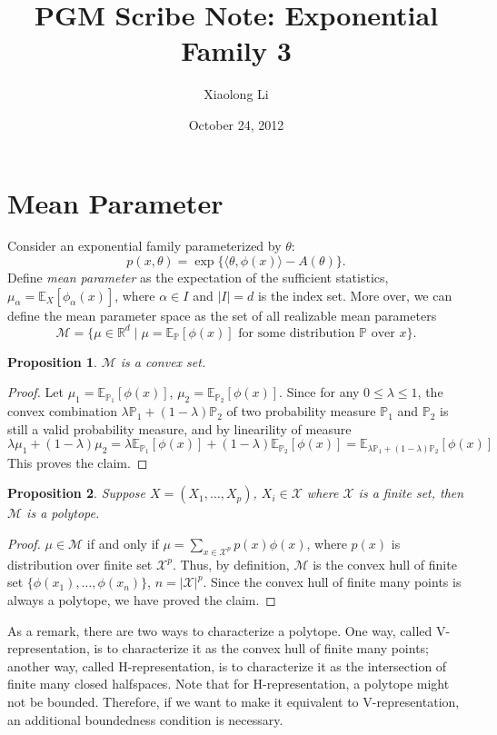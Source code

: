 \documentclass[11pt]{article}
\title{PGM Scribe Note: Exponential Family 3}
\author{Xiaolong Li}
\date{October 24, 2012}
\newcommand{\Xc}{\mathcal{X}}
\newcommand{\Mc}{\mathcal{M}}
\newcommand{\E}{\mathbb{E}}
\newcommand{\R}{\mathbb{R}}
\newcommand{\prob}{\mathbb{P}}
\newcommand{\1}{\mathbbm{1}}
\newtheorem{prop}{Proposition}
\begin{document}
\maketitle

\section{Mean Parameter}
Consider an exponential family parameterized by $\theta$:
\[
p(x, \theta) = \exp\{\langle \theta, \phi(x) \rangle - A(\theta)\}.
\]
Define \emph{mean parameter} as the expectation of the sufficient statistics,
$\mu_\alpha = \E_X[\phi_\alpha(x)]$, where $\alpha \in I$ and $|I| = d$ is the index set. More
over, we can define the mean parameter space as the set of all realizable mean
parameters
\[
\Mc = \{\mu \in \R^d \; | \; \mu = \E_\prob[\phi(x)] \text{ for some distribution } \prob \text{ over } x\}.
\]

\begin{prop}
$\Mc$ is a convex set.
\end{prop}
\begin{proof}
Let $\mu_1 = \E_{\prob_1}[\phi(x)]$, $\mu_2 = \E_{\prob_2}[\phi(x)]$.
Since for any $0 \leq \lambda \leq 1$, the convex combination $\lambda \prob_1 + (1-\lambda)\prob_2$ of two 
probability measure $\prob_1$ and $\prob_2$ is still a valid probability measure, and by linearility of measure
\[
\lambda \mu_1 + (1-\lambda)\mu_2 = \lambda \E_{\prob_1}[\phi(x)] + (1-\lambda) \E_{\prob_2}[\phi(x)]
= \E_{\lambda \prob_1 + (1-\lambda)\prob_2}[\phi(x)]
\]
This proves the claim.
\end{proof}

\begin{prop}
Suppose $X = (X_1, \ldots, X_p)$, $X_i \in \Xc$ where $\Xc$ is a finite set, then $\Mc$ is a polytope.
\end{prop}
\begin{proof}
$\mu \in \Mc$ if and only if $\mu = \sum_{x \in \Xc^p} p(x)\phi(x)$, where $p(x)$ is distribution over
finite set $\Xc^p$. Thus, by definition, $\Mc$ is the convex hull of finite set
$\{\phi(x_1), \ldots, \phi(x_n)\}$, $n = |\Xc|^p$. Since the convex hull of finite many points is always
a polytope, we have proved the claim.
\end{proof}

As a remark, there are two ways to characterize a polytope. One way, called V-representation, is to characterize
it as the convex hull of finite many points; another way, called H-representation, is to characterize it as
the intersection of finite many closed halfspaces. Note that for H-representation, a polytope might not be
bounded. Therefore, if we want to make it equivalent to V-representation, an additional boundedness condition
is necessary.
\end{document}
